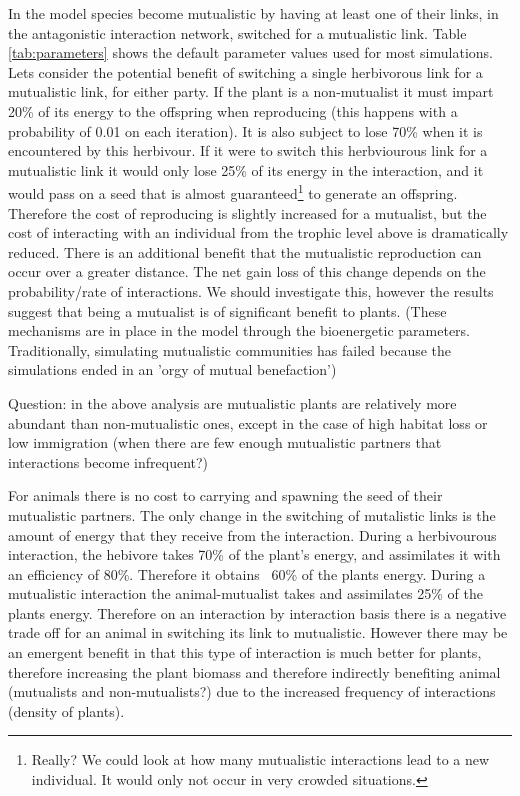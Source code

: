 \begin{itemize}
In the model species become mutualistic by having at least one of their links, in the antagonistic interaction network, switched for a mutualistic link. Table \ref{tab:parameters} shows the default parameter values used for most simulations. Lets consider the potential benefit of switching a single herbivorous link for a mutualistic link, for either party. If the plant is a non-mutualist it must impart 20\% of its energy to the offspring when reproducing (this happens with a probability of 0.01 on each iteration). It is also subject to lose 70\% when it is encountered by this herbivour. If it were to switch this herbviourous link for a mutualistic link it would only lose 25\% of its energy in the interaction, and it would pass on a seed that is almost guaranteed\footnote{Really? We could look at how many mutualistic interactions lead to a new individual. It would only not occur in very crowded situations.} to generate an offspring. Therefore the cost of reproducing is slightly increased for a mutualist, but the cost of interacting with an individual from the trophic level above is dramatically reduced. There is an additional benefit that the mutualistic reproduction can occur over a greater distance. The net gain loss of this change depends on the probability/rate of interactions. We should investigate this, however the results suggest that being a mutualist is of significant benefit to plants. (These mechanisms are in place in the model through the bioenergetic parameters. Traditionally, simulating mutualistic communities has failed because the simulations ended in an 'orgy of mutual benefaction')

Question: in the above analysis are mutualistic plants are relatively more abundant than non-mutualistic ones, except in the case of high habitat loss or low immigration (when there are few enough mutualistic partners that interactions become infrequent?) 

For animals there is no cost to carrying and spawning the seed of their mutualistic partners. The only change in the switching of mutalistic links is the amount of energy that they receive from the interaction. During a herbivourous interaction, the hebivore takes 70\% of the plant's energy, and assimilates it with an efficiency of 80\%. Therefore it obtains ~60\% of the plants energy. During a mutualistic interaction the animal-mutualist takes and assimilates 25\% of the plants energy. Therefore on an interaction by interaction basis there is a negative trade off for an animal in switching its link to mutualistic. However there may be an emergent benefit in that this type of interaction is much better for plants, therefore increasing the plant biomass and therefore indirectly benefiting animal (mutualists and non-mutualists?) due to the increased frequency of interactions (density of plants).       



\end{itemize}
